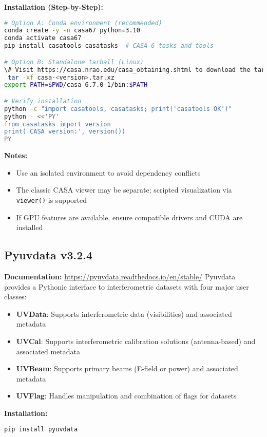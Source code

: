 \documentclass[11pt]{article}
\begin{document}
\textbf{Installation (Step-by-Step):}
\begin{lstlisting}[language=bash]
# Option A: Conda environment (recommended)
conda create -y -n casa67 python=3.10
conda activate casa67
pip install casatools casatasks  # CASA 6 tasks and tools

# Option B: Standalone tarball (Linux)
\# Visit https://casa.nrao.edu/casa_obtaining.shtml to download the tarball for your platform
 tar -xf casa-<version>.tar.xz
export PATH=$PWD/casa-6.7.0-1/bin:$PATH

# Verify installation
python -c "import casatools, casatasks; print('casatools OK')"
python - <<'PY'
from casatasks import version
print('CASA version:', version())
PY
\end{lstlisting}
\textbf{Notes:}
\begin{itemize}
    \item Use an isolated environment to avoid dependency conflicts
    \item The classic CASA viewer may be separate; scripted visualization via \texttt{viewer()} is supported
    \item If GPU features are available, ensure compatible drivers and CUDA are installed
\end{itemize}

\subsection{Pyuvdata v3.2.4}
\textbf{Documentation:} \url{https://pyuvdata.readthedocs.io/en/stable/}
Pyuvdata provides a Pythonic interface to interferometric datasets with four major user classes:

\begin{itemize}
    \item \textbf{UVData}: Supports interferometric data (visibilities) and associated metadata
    \item \textbf{UVCal}: Supports interferometric calibration solutions (antenna-based) and associated metadata
    \item \textbf{UVBeam}: Supports primary beams (E-field or power) and associated metadata
    \item \textbf{UVFlag}: Handles manipulation and combination of flags for datasets
\end{itemize}

\textbf{Installation:}
\begin{lstlisting}[language=bash]
pip install pyuvdata
\end{lstlisting}
\end{document}
